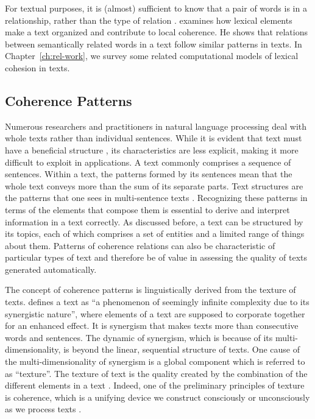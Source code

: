 For textual purposes, it is (almost) sufficient to know that a pair of words is in a relationship, rather than the type of relation \cite{halliday76}. %
 examines how lexical elements make a text organized and contribute to local coherence. 
He shows that relations between semantically related words in a text follow similar patterns in texts. 
In Chapter~\ref{ch:rel-work}, we survey some related computational models of lexical cohesion in texts.  


\subsection{Coherence Patterns}

Numerous researchers and practitioners in natural language processing deal with whole texts rather than individual sentences. 
While it is evident that text must have a beneficial structure \cite{webber12a}, its characteristics are less explicit, making it more difficult to exploit in applications. 
A text commonly comprises a sequence of sentences. 
Within a text, the patterns formed by its sentences mean that the whole text conveys more than the sum of its separate parts. 
Text structures are the patterns that one sees in \mbox{multi-sentence} texts \cite{webber12a}. 
Recognizing these patterns in terms of the elements that compose them is essential to derive and interpret information in a text correctly. 
As discussed before, a text can be structured by its topics, each of which comprises a set of entities and a limited range of things about them. 
Patterns of coherence relations can also be characteristic of particular types of text and therefore be of value in assessing the quality of texts generated automatically. 

The concept of coherence patterns is linguistically derived from the texture of texts. 
 defines a text as ``a phenomenon of seemingly infinite complexity due to its synergistic nature'', where elements of a text are supposed to corporate together for an enhanced effect. 
It is synergism that makes texts more than consecutive words and sentences. 
The dynamic of synergism, which is because of its multi-dimensionality, is beyond the linear, sequential structure of texts. 
One cause of the multi-dimensionality of synergism is a global component which is referred to as ``texture''. 
The texture of text is the quality created by the combination of the different elements in a text \cite{stoddard91}. 
Indeed, one of the preliminary principles of texture is coherence, which is a  unifying device we construct consciously or unconsciously as we process texts \cite{halliday76}. 

